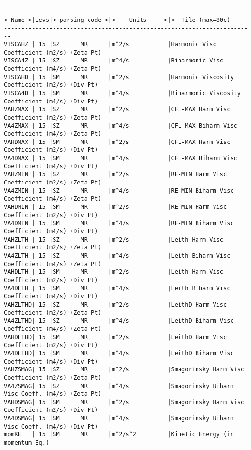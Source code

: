 \begin{verbatim}

------------------------------------------------------------------------
<-Name->|Levs|<-parsing code->|<--  Units   -->|<- Tile (max=80c) 
------------------------------------------------------------------------
VISCAHZ | 15 |SZ      MR      |m^2/s           |Harmonic Visc Coefficient (m2/s) (Zeta Pt)
VISCA4Z | 15 |SZ      MR      |m^4/s           |Biharmonic Visc Coefficient (m4/s) (Zeta Pt)
VISCAHD | 15 |SM      MR      |m^2/s           |Harmonic Viscosity Coefficient (m2/s) (Div Pt)
VISCA4D | 15 |SM      MR      |m^4/s           |Biharmonic Viscosity Coefficient (m4/s) (Div Pt)
VAHZMAX | 15 |SZ      MR      |m^2/s           |CFL-MAX Harm Visc Coefficient (m2/s) (Zeta Pt)
VA4ZMAX | 15 |SZ      MR      |m^4/s           |CFL-MAX Biharm Visc Coefficient (m4/s) (Zeta Pt)
VAHDMAX | 15 |SM      MR      |m^2/s           |CFL-MAX Harm Visc Coefficient (m2/s) (Div Pt)
VA4DMAX | 15 |SM      MR      |m^4/s           |CFL-MAX Biharm Visc Coefficient (m4/s) (Div Pt)
VAHZMIN | 15 |SZ      MR      |m^2/s           |RE-MIN Harm Visc Coefficient (m2/s) (Zeta Pt)
VA4ZMIN | 15 |SZ      MR      |m^4/s           |RE-MIN Biharm Visc Coefficient (m4/s) (Zeta Pt)
VAHDMIN | 15 |SM      MR      |m^2/s           |RE-MIN Harm Visc Coefficient (m2/s) (Div Pt)
VA4DMIN | 15 |SM      MR      |m^4/s           |RE-MIN Biharm Visc Coefficient (m4/s) (Div Pt)
VAHZLTH | 15 |SZ      MR      |m^2/s           |Leith Harm Visc Coefficient (m2/s) (Zeta Pt)
VA4ZLTH | 15 |SZ      MR      |m^4/s           |Leith Biharm Visc Coefficient (m4/s) (Zeta Pt)
VAHDLTH | 15 |SM      MR      |m^2/s           |Leith Harm Visc Coefficient (m2/s) (Div Pt)
VA4DLTH | 15 |SM      MR      |m^4/s           |Leith Biharm Visc Coefficient (m4/s) (Div Pt)
VAHZLTHD| 15 |SZ      MR      |m^2/s           |LeithD Harm Visc Coefficient (m2/s) (Zeta Pt)
VA4ZLTHD| 15 |SZ      MR      |m^4/s           |LeithD Biharm Visc Coefficient (m4/s) (Zeta Pt)
VAHDLTHD| 15 |SM      MR      |m^2/s           |LeithD Harm Visc Coefficient (m2/s) (Div Pt)
VA4DLTHD| 15 |SM      MR      |m^4/s           |LeithD Biharm Visc Coefficient (m4/s) (Div Pt)
VAHZSMAG| 15 |SZ      MR      |m^2/s           |Smagorinsky Harm Visc Coefficient (m2/s) (Zeta Pt)
VA4ZSMAG| 15 |SZ      MR      |m^4/s           |Smagorinsky Biharm Visc Coeff. (m4/s) (Zeta Pt)
VAHDSMAG| 15 |SM      MR      |m^2/s           |Smagorinsky Harm Visc Coefficient (m2/s) (Div Pt)
VA4DSMAG| 15 |SM      MR      |m^4/s           |Smagorinsky Biharm Visc Coeff. (m4/s) (Div Pt)
momKE   | 15 |SM      MR      |m^2/s^2         |Kinetic Energy (in momentum Eq.)

\end{verbatim}
